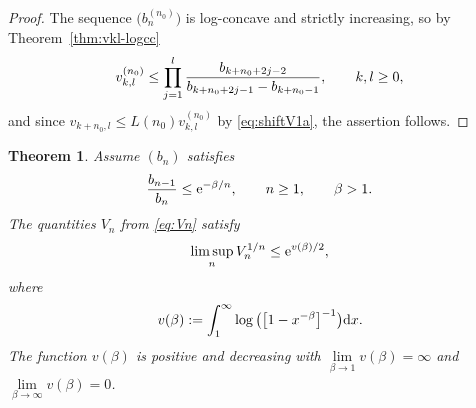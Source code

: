 \documentclass[pdftex]{sigma}
\numberwithin{equation}{section}
\newtheorem{thm}{Theorem}[section]
\begin{document}
\begin{proof} The sequence $\big(b_n^{(n_0)}\big)$ is log-concave and strictly increasing, so by Theorem~\ref{thm:vkl-logcc}
\begin{gather*}
v_{k,l}^{(n_0)}\le \prod_{j=1}^l {b_{k+n_0+2j-2}\over b_{k+n_0+2j-1}-b_{k+n_0-1}},\qquad k, l\ge 0,
\end{gather*}
and since $v_{k+n_0,l}\le L(n_0)v_{k,l}^{(n_0)}$ by \eqref{eq:shiftV1a}, the assertion follows.
\end{proof}

\begin{thm}\label{thm:genlogcc} Assume $(b_n)$ satisfies
\begin{gather*}
{b_{n-1}\over b_n}\le {\rm e}^{-\beta/n},\qquad n\ge 1, \qquad \beta>1.
\end{gather*}
The quantities $V_n$ from \eqref{eq:Vn} satisfy
\begin{gather}\label{eq:Vn-logcc1}
\limsup_{n} V_n^{1/n}\le {\rm e}^{v(\beta)/2},
\end{gather}
where
\begin{gather}\label{eq:taubeta}
v(\beta):=\int_1^\infty\log\big(\big[1-x^{-\beta}\big]^{-1}\big){\rm d}x.
\end{gather}
The function $v(\beta)$ is positive and decreasing with $\lim\limits_{\beta\to1}v(\beta)=\infty$ and $\lim\limits_{\beta\to\infty}v(\beta)=0$.
\end{thm}
\end{document}
